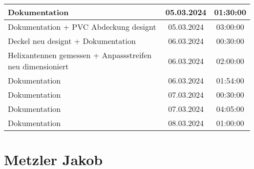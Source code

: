 \begin{longtable}{|l|c|c|}
	\hline
	Dokumentation & 05.03.2024 & 01:30:00 \\
	\hline
	Dokumentation + PVC Abdeckung designt & 05.03.2024 & 03:00:00 \\
	\hline
	Deckel neu designt + Dokumentation & 06.03.2024 & 00:30:00 \\
	\hline
	Helixantennen gemessen + Anpassstreifen neu dimensioniert & 06.03.2024 & 02:00:00 \\
	\hline
	Dokumentation & 06.03.2024 & 01:54:00 \\
	\hline
	Dokumentation & 07.03.2024 & 00:30:00 \\
	\hline
	Dokumentation & 07.03.2024 & 04:05:00 \\
	\hline
	Dokumentation & 08.03.2024 & 01:00:00 \\
	\hline
\end{longtable}

\section{Metzler Jakob}

